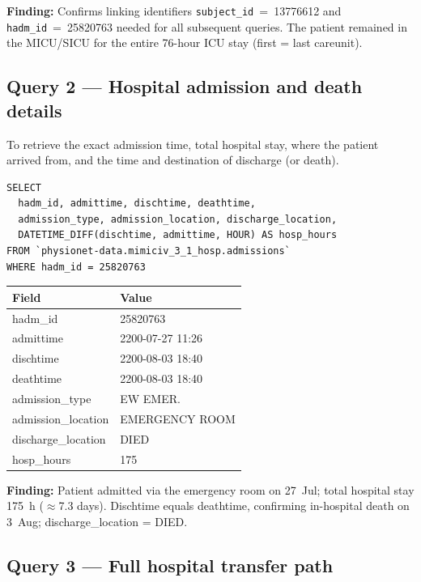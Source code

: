 \documentclass[12pt, a4paper]{article}
\begin{document}
\noindent\textbf{Finding:} Confirms linking identifiers \texttt{subject\_id}~=~13776612 and
\texttt{hadm\_id}~=~25820763 needed for all subsequent queries. The patient
remained in the MICU/SICU for the entire 76-hour ICU stay (first = last careunit).

\subsection*{Query 2 --- Hospital admission and death details}

To retrieve the exact admission time, total hospital stay, where the patient
arrived from, and the time and destination of discharge (or death).

\begin{lstlisting}[style=sql]
SELECT
  hadm_id, admittime, dischtime, deathtime,
  admission_type, admission_location, discharge_location,
  DATETIME_DIFF(dischtime, admittime, HOUR) AS hosp_hours
FROM `physionet-data.mimiciv_3_1_hosp.admissions`
WHERE hadm_id = 25820763
\end{lstlisting}

\medskip
\begin{table}[h]
\centering\scriptsize
\begin{tabular}{ll}
\toprule
\textbf{Field} & \textbf{Value} \\
\midrule
hadm\_id            & 25820763 \\
admittime           & 2200-07-27 11:26 \\
dischtime           & 2200-08-03 18:40 \\
deathtime           & 2200-08-03 18:40 \\
admission\_type     & EW EMER. \\
admission\_location & EMERGENCY ROOM \\
discharge\_location & DIED \\
hosp\_hours         & 175 \\
\bottomrule
\end{tabular}
\end{table}

\noindent\textbf{Finding:} Patient admitted via the emergency room on 27~Jul;
total hospital stay 175~h ($\approx$7.3 days). Dischtime equals deathtime,
confirming in-hospital death on 3~Aug; discharge\_location = DIED.

\subsection*{Query 3 --- Full hospital transfer path}
\end{document}
